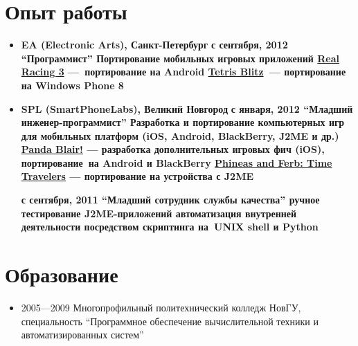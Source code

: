 \section{Опыт работы}
\begin{itemize}
\item {
\fontsize{14pt}{14pt}\selectfont
\bfseries EA (Electronic Arts)\mdseries, Санкт-Петербург
}
\subitem \bfseries с сентября, 2012 ``Программист''\mdseries
\subsubitem Портирование мобильных игровых приложений
\subsubitem\href{http://www.facebook.com/realracing}{Real Racing 3} ---\
портирование на Android
\subsubitem\href{http://www.windowsphone.com/en-us/store/app/tetris-blitz/806c88c7-528c-4563-9c0a-09ef31f14d61}{Tetris Blitz}\
--- портирование на Windows Phone 8

\item {
\fontsize{14pt}{14pt}\selectfont
\bfseries SPL (SmartPhoneLabs)\mdseries, Великий Новгород
}
\subitem \bfseries с января, 2012 ``Младший инженер-программист''\mdseries
\subsubitem Разработка и портирование компьютерных игр для мобильных платформ
(iOS, Android, BlackBerry, J2ME и др.)
\subsubitem\href{https://itunes.apple.com/us/app/panda-blair!/id500995558?mt=8}{Panda Blair!} --- разработка дополнительных игровых фич (iOS), портирование\
на Android и BlackBerry
\subsubitem\href{http://java.mob.org/game/phineas\_and\_ferb\_time\_travelers.html}{Phineas and Ferb: Time Travelers} --- портирование на устройства с J2ME

\subitem \bfseries с сентября, 2011 ``Младший сотрудник службы качества''
\mdseries
\subsubitem ручное тестирование J2ME-приложений
\subsubitem автоматизация внутренней деятельности посредством скриптинга на\
UNIX shell и Python
\end{itemize}

\section{Образование}
\begin{itemize}
\item 2005---2009 Многопрофильный политехнический колледж НовГУ, специальность
``Программное обеспечение вычислительной техники и автоматизированных систем''
\end{itemize}


